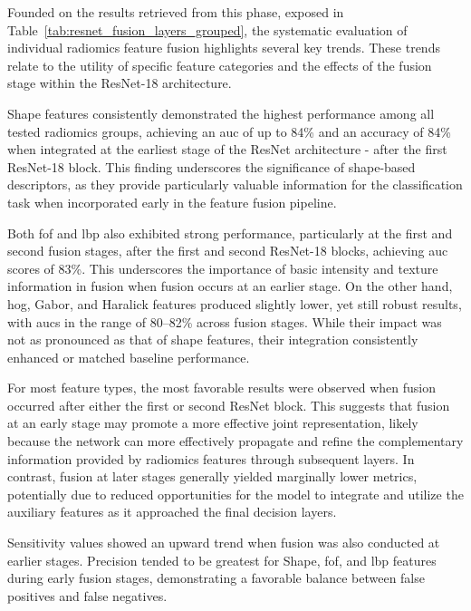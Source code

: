 Founded on the results retrieved from this phase, exposed in Table~\ref{tab:resnet_fusion_layers_grouped}, the systematic evaluation of individual radiomics feature fusion highlights several key trends. These trends relate to the utility of specific feature categories and the effects of the fusion stage within the ResNet-18 architecture.

Shape features consistently demonstrated the highest performance among all tested radiomics groups, achieving an \ac{auc} of up to 84\% and an accuracy of 84\% when integrated at the earliest stage of the ResNet architecture - after the first ResNet-18 block. This finding underscores the significance of shape-based descriptors, as they provide particularly valuable information for the classification task when incorporated early in the feature fusion pipeline.

Both \ac{fof} and \ac{lbp} also exhibited strong performance, particularly at the first and second fusion stages, after the first and second ResNet-18 blocks, achieving \ac{auc} scores of 83\%. This underscores the importance of basic intensity and texture information in fusion when fusion occurs at an earlier stage. 
On the other hand, \ac{hog}, Gabor, and Haralick features produced slightly lower, yet still robust results, with \acp{auc} in the range of 80–82\% across fusion stages. While their impact was not as pronounced as that of shape features, their integration consistently enhanced or matched baseline performance.

For most feature types, the most favorable results were observed when fusion occurred after either the first or second ResNet block.
This suggests that fusion at an early stage may promote a more effective joint representation, likely because the network can more effectively propagate and refine the complementary information provided by radiomics features through subsequent layers.
 In contrast, fusion at later stages generally yielded marginally lower metrics, potentially due to reduced opportunities for the model to integrate and utilize the auxiliary features as it approached the final decision layers.

Sensitivity values showed an upward trend when fusion was also conducted at earlier stages. Precision tended to be greatest for Shape, \ac{fof}, and \ac{lbp} features during early fusion stages, demonstrating a favorable balance between false positives and false negatives.

